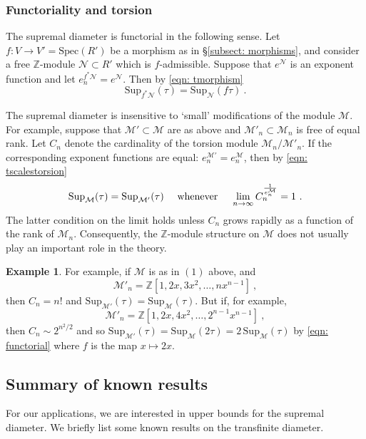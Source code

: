 \documentclass[a4paper,10pt]{amsart}
\theoremstyle{definition}
\newtheorem{example}[thm]{Example}
\theoremstyle{remark}
\numberwithin{equation}{section}
\newcommand{\Z}{\mathbb Z}
\newcommand{\ts}{\mathrm{Sup}}
\newcommand{\0}{\color{blue}{\mathsf{0}}}
\begin{document}
 \subsubsection{Functoriality and torsion}   The supremal diameter is functorial in the following sense.
Let $f: V \rightarrow V' = \mathrm{Spec}(R')$ be a morphism as in  \S\ref{subsect: morphisms}, and consider a free $\Z$-module 
 $\mathcal{N} \subset R'$ which is $f$-admissible.  Suppose that $e^{\mathcal{N}}$ is an exponent function and let  $e^{f^*\mathcal{N}}_n=  e^{\mathcal{N}}$. Then  by \eqref{eqn: tmorphism}
  \begin{equation} \label{eqn: functorial} 
  \ts_{f^*\mathcal{N}} (\tau) =  \ts_{\mathcal{N}}( f \tau )\ .
  \end{equation} 




The supremal diameter is insensitive to `small' modifications of the module $\mathcal{M}$. For example, 
 suppose that $\mathcal{M}' \subset \mathcal{M}$ are as above  and $\mathcal{M}'_n \subset \mathcal{M}_n$ is free of equal rank. Let $C_n$ denote the cardinality of the torsion module $\mathcal{M}_n/\mathcal{M}'_n$. If the corresponding exponent functions are equal: $e^{\mathcal{M}'}_n = e^{\mathcal{M}}_n$,  then  by \eqref{eqn: tscalestorsion}
 \[   \ts_{\mathcal{M}} (\tau) =   \ts_{\mathcal{M}'} (\tau)  \quad \hbox{ whenever } \quad 
 \lim_{n\rightarrow \infty}  C_n^{\frac{1}{e^{\mathcal{M}}_n}}=1  \ .\] 
 The latter condition on the limit   holds unless $C_n$ grows  rapidly as a function of the rank of $\mathcal{M}_n$. 
 Consequently, the $\Z$-module structure on $\mathcal{M}$ does not usually play an important role in the theory. 
 
 \begin{example}
 For example, if $\mathcal{M}$ is as in $(1)$ above, and \
 \[ \mathcal{M}'_n= \Z[1, 2x, 3  x^2, \ldots, n x^{n-1}]\ , \]
 then $C_n= n!$ and $\ts_{\mathcal{M'}}(\tau) = \ts_{\mathcal{M}}(\tau)$. But if, for example, 
 \[ \mathcal{M}'_n= \Z[1, 2x,  4 x^2, \ldots,  2^{n-1} x^{n-1}] \ , \]
 then  $C_n \sim 2^{n^2/2}$ and so $\ts_{\mathcal{M}'}(\tau) =    \ts_{\mathcal{M}}(2\tau)  =2  \,\ts_{\mathcal{M}}(\tau)  $ by \eqref{eqn: functorial} where $f$ is the map $x\mapsto 2 x$.
\end{example}
 
  
  \subsection{Summary of known results}
    For our applications, we are interested in upper bounds for the supremal diameter. 
    We briefly list some known results on the transfinite diameter.
    
\end{document}
